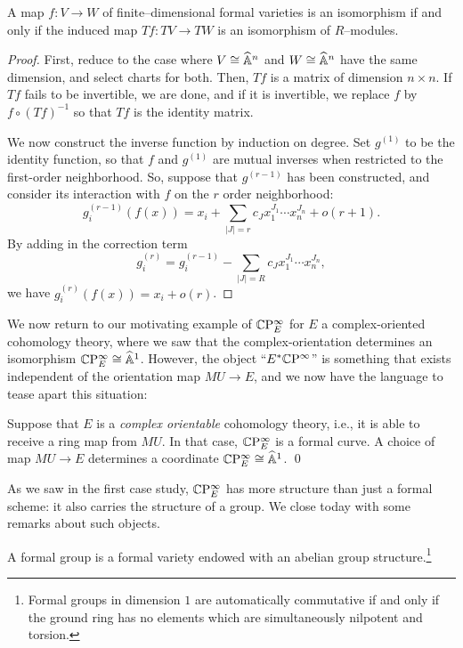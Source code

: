 \begin{theorem}\label{InverseFunctionTheoremForFVars}
A map $f: V \to W$ of finite--dimensional formal varieties is an isomorphism if and only if the induced map $Tf: TV \to TW$ is an isomorphism of $R$--modules.
\end{theorem}
\begin{proof}
First, reduce to the case where $V \cong \widehat{\mathbb{A}}^n$ and $W \cong \widehat{\mathbb{A}}^n$ have the same dimension, and select charts for both.  Then, $Tf$ is a matrix of dimension $n \times n$.  If $Tf$ fails to be invertible, we are done, and if it is invertible, we replace $f$ by $f \circ (Tf)^{-1}$ so that $Tf$ is the identity matrix.

We now construct the inverse function by induction on degree.  Set $g^{(1)}$ to be the identity function, so that $f$ and $g^{(1)}$ are mutual inverses when restricted to the first-order neighborhood.  So, suppose that $g^{(r-1)}$ has been constructed, and consider its interaction with $f$ on the $r${\th} order neighborhood: \[g_i^{(r-1)}(f(x)) = x_i + \sum_{|J| = r} c_J x_1^{J_1} \cdots x_n^{J_n} + o(r+1). \]  By adding in the correction term \[g_i^{(r)} = g_i^{(r-1)} - \sum_{|J| = R} c_J x_1^{J_1} \cdots x_n^{J_n},\] we have $g_i^{(r)}(f(x)) = x_i + o(r)$.
\end{proof}

We now return to our motivating example of $\mathbb{C}\mathrm P^\infty_E$ for $E$ a complex-oriented cohomology theory, where we saw that the complex-orientation determines an isomorphism $\mathbb{C}\mathrm P^\infty_E \cong \widehat{\mathbb{A}}^1$.  However, the object ``$E^* \mathbb{C}\mathrm P^\infty$'' is something that exists independent of the orientation map $MU \to E$, and we now have the language to tease apart this situation:
\begin{lemma}
Suppose that $E$ is a \textit{complex orientable} cohomology theory, i.e., it is able to receive a ring map from $MU$.  In that case, $\mathbb{C}\mathrm P^\infty_E$ is a formal curve.  A choice of map $MU \to E$ determines a coordinate $\mathbb{C}\mathrm P^\infty_E \cong \widehat{\mathbb{A}}^1$. \qed
\end{lemma}

As we saw in the first case study, $\mathbb{C}\mathrm P^\infty_E$ has more structure than just a formal scheme: it also carries the structure of a group.  We close today with some remarks about such objects.

\begin{definition}
A formal group is a formal variety endowed with an abelian group structure.\footnote{Formal groups in dimension $1$ are automatically commutative if and only if the ground ring has no elements which are simultaneously nilpotent and torsion.}
\end{definition}

